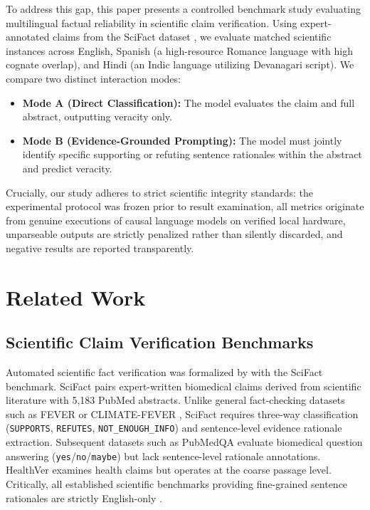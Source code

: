 \documentclass[10pt,twocolumn]{article}
\begin{document}
To address this gap, this paper presents a controlled benchmark study evaluating multilingual factual reliability in scientific claim verification. Using expert-annotated claims from the SciFact dataset \cite{wadden2020fact}, we evaluate matched scientific instances across English, Spanish (a high-resource Romance language with high cognate overlap), and Hindi (an Indic language utilizing Devanagari script). We compare two distinct interaction modes:
\begin{itemize}
    \item \textbf{Mode A (Direct Classification):} The model evaluates the claim and full abstract, outputting veracity only.
    \item \textbf{Mode B (Evidence-Grounded Prompting):} The model must jointly identify specific supporting or refuting sentence rationales within the abstract and predict veracity.
\end{itemize}

Crucially, our study adheres to strict scientific integrity standards: the experimental protocol was frozen prior to result examination, all metrics originate from genuine executions of causal language models on verified local hardware, unparseable outputs are strictly penalized rather than silently discarded, and negative results are reported transparently.

\section{Related Work}
\label{sec:related}

\subsection{Scientific Claim Verification Benchmarks}
Automated scientific fact verification was formalized by \cite{wadden2020fact} with the SciFact benchmark. SciFact pairs expert-written biomedical claims derived from scientific literature with 5,183 PubMed abstracts. Unlike general fact-checking datasets such as FEVER \cite{thorne2018fever} or CLIMATE-FEVER \cite{diggelmann2020climate}, SciFact requires three-way classification (\texttt{SUPPORTS}, \texttt{REFUTES}, \texttt{NOT\_ENOUGH\_INFO}) and sentence-level evidence rationale extraction. Subsequent datasets such as PubMedQA \cite{jin2019pubmedqa} evaluate biomedical question answering (\texttt{yes}/\texttt{no}/\texttt{maybe}) but lack sentence-level rationale annotations. HealthVer \cite{kumar2026benchmarking} examines health claims but operates at the coarse passage level. Critically, all established scientific benchmarks providing fine-grained sentence rationales are strictly English-only \cite{wadden2020fact}.
\end{document}
